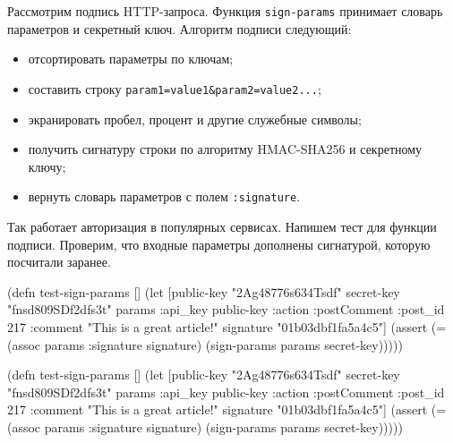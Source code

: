Рассмотрим подпись HTTP-запроса. Функция \verb|sign-params| принимает словарь
параметров и секретный ключ. Алгоритм подписи следующий:

\begin{itemize}


\item
  отсортировать параметры по ключам;

\item
  составить строку \texttt{param1=value1\&param2\-=va\-lue2...};

\item
  экранировать пробел, процент и другие служебные символы;

\item
  получить сигнатуру строки по алгоритму HMAC-SHA256 и секретному ключу;

\item
  вернуть словарь параметров с полем \texttt{:sig\-na\-tu\-re}.

\end{itemize}


Так работает авторизация в популярных сервисах. Напишем тест для функции
подписи. Проверим, что входные параметры дополнены сигнатурой, которую посчитали
заранее.

\label{hmac-sha256}

\ifnarrow

\begin{english}
  \begin{clojure}
(defn test-sign-params []
  (let [public-key "2Ag48776s634Tsdf"
        secret-key "fnsd809SDf2dfs3t"
        params
        {:api_key public-key
         :action :postComment
         :post_id 217
         :comment
         "This is a great article!"}
        signature "01b03dbf1fa5a4c5"]
    (assert
      (= (assoc params
           :signature signature)
         (sign-params params
           secret-key)))))
  \end{clojure}
\end{english}

\else

\begin{english}
  \begin{clojure}
(defn test-sign-params []
  (let [public-key "2Ag48776s634Tsdf"
        secret-key "fnsd809SDf2dfs3t"
        params {:api_key public-key
                :action :postComment
                :post_id 217
                :comment "This is a great article!"}
        signature "01b03dbf1fa5a4c5"]
    (assert (= (assoc params :signature signature)
               (sign-params params secret-key)))))
  \end{clojure}
\end{english}

